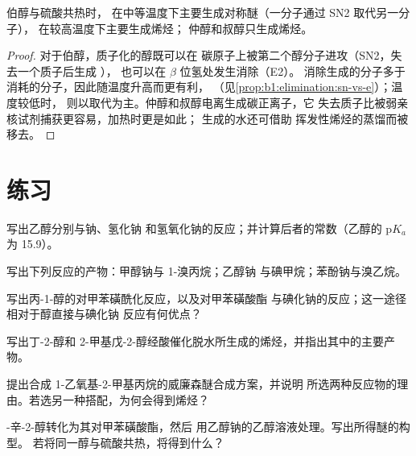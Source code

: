 \begin{proposition}[醚还是烯烃]\label{prop:b1:alcohol-activation:ether-vs-alkene}
伯醇与硫酸共热时，
在中等温度下主要生成对称醚（一分子通过 SN2 取代另一分子），
在较高温度下主要生成烯烃；
仲醇和叔醇只生成烯烃。
\end{proposition}

\begin{proof}
对于伯醇，质子化的醇既可以在
碳原子上被第二个醇分子进攻（SN2，失去一个质子后生成 ），
也可以在 $\beta$ 位氢处发生消除（E2）。
消除生成的分子多于消耗的分子，因此随温度升高而更有利，
（见\cref{prop:b1:elimination:sn-vs-e}）；温度较低时，
则以取代为主。仲醇和叔醇电离生成碳正离子，它
失去质子比被弱亲核试剂捕获更容易，加热时更是如此；
生成的水还可借助
挥发性烯烃的蒸馏而被移去。
\end{proof}

\section{练习}

\begin{exercise}[$\star$]\label{exo:b1:alcohol-activation:1}
写出乙醇分别与钠、氢化钠
和氢氧化钠的反应；并计算后者的常数（乙醇的 $\mathrm{p}K_a$
为 15.9）。
\end{exercise}

\begin{exercise}[$\star$]\label{exo:b1:alcohol-activation:2}
写出下列反应的产物：甲醇钠与 1-溴丙烷；乙醇钠
与碘甲烷；苯酚钠与溴乙烷。
\end{exercise}

\begin{exercise}[$\star$]\label{exo:b1:alcohol-activation:3}
写出丙-1-醇的对甲苯磺酰化反应，以及对甲苯磺酸酯
与碘化钠的反应；这一途径相对于醇直接与碘化钠
反应有何优点？
\end{exercise}

\begin{exercise}[$\star$]\label{exo:b1:alcohol-activation:4}
写出丁-2-醇和
2-甲基戊-2-醇经酸催化脱水所生成的烯烃，并指出其中的主要产物。
\end{exercise}

\begin{exercise}[$\star\star$]\label{exo:b1:alcohol-activation:5}
提出合成 1-乙氧基-2-甲基丙烷的威廉森醚合成方案，并说明
所选两种反应物的理由。若选另一种搭配，为何会得到烯烃？
\end{exercise}

\begin{exercise}[$\star\star$]\label{exo:b1:alcohol-activation:6}
-辛-2-醇转化为其对甲苯磺酸酯，然后
用乙醇钠的乙醇溶液处理。写出所得醚的构型。
若将同一醇与硫酸共热，将得到什么？
\end{exercise}

